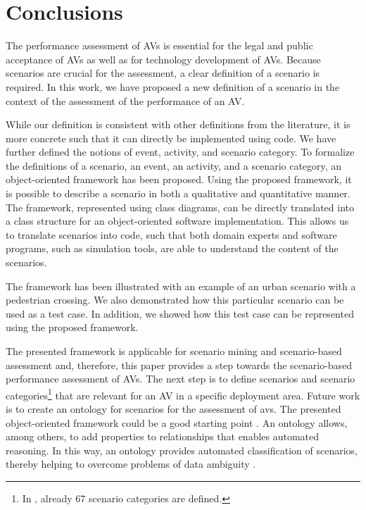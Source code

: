 \section{Conclusions}
\label{sec:conclusion}

The performance assessment of AVs is essential for the legal and public acceptance of AVs as well as for technology development of AVs. 
Because scenarios are crucial for the assessment, a clear definition of a scenario is required.
In this work, we have proposed a new definition of a scenario in the context of the assessment of the performance of an AV. 
 
While our definition is consistent with other definitions from the literature, it is more concrete such that it can directly be implemented using code.
We have further defined the notions of event, activity, and scenario category. 
To formalize the definitions of a scenario, an event, an activity, and a scenario category, an \cstartb object-oriented framework \cendb has been proposed. Using the proposed \cstartb framework\cendb, it is possible to describe a scenario in both a qualitative and quantitative manner. The \cstartb framework\cendb, represented using \cstartb class diagrams\cendb, can be directly translated into a class structure for an object-oriented software implementation. This allows us to translate scenarios into code, such that both domain experts and software programs, such as simulation tools, are able to understand the content of the scenarios. 

The \cstartb framework \cendb has been illustrated with an example of an urban scenario with a pedestrian crossing. 
We also demonstrated how this particular scenario can be used as a test case. In addition, we showed how this test case can be represented using the proposed \cstartb framework\cendb.

The presented \cstartb framework \cendb is applicable for scenario mining \autocite{paardekooper2019dataset6000km, degelder2020scenariomining} and scenario-based assessment \autocite{elrofai2018scenario, putz2017pegasus} and, therefore, this paper provides a step towards the scenario-based performance assessment of AVs. The next step is to define scenarios and scenario categories\footnote{In \autocite{degelder2019scenariocategories}, already 67 scenario categories are defined.} that are relevant for an AV in a specific deployment area. 
\cstartc Future work is to create an ontology for scenarios for the assessment of \acp{av}. The presented object-oriented framework could be a good starting point \autocite{siricharoen2009ontology}. An ontology allows, among others, to add properties to relationships that enables automated reasoning. In this way, an ontology provides automated classification of scenarios, thereby helping to overcome problems of data ambiguity \autocite{OpenSCENARIO2}. \cendc

